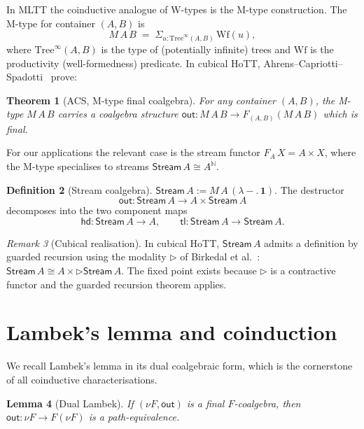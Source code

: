 \documentclass[12pt]{article}
\newtheorem{theorem}{Theorem}[section]
\newtheorem{lemma}[theorem]{Lemma}
\theoremstyle{definition}
\newtheorem{definition}[theorem]{Definition}
\theoremstyle{remark}
\newtheorem{remark}[theorem]{Remark}
\newcommand{\N}{\mathbb{N}}
\newcommand{\Stream}{\mathsf{Stream}}
\newcommand{\hd}{\mathsf{hd}}
\newcommand{\tl}{\mathsf{tl}}
\newcommand{\out}{\mathsf{out}}
\begin{document}
In MLTT the coinductive analogue of W-types is the M-type
construction. The M-type for container $(A,B)$ is
\[
M\,A\,B \;=\; \Sigma_{u: \mathrm{Tree}^\infty(A,B)}\,\mathrm{Wf}(u),
\]
where $\mathrm{Tree}^\infty(A,B)$ is the type of (potentially
infinite) trees and $\mathrm{Wf}$ is the productivity (well-formedness)
predicate. In cubical HoTT, Ahrens--Capriotti--Spadotti~\cite{ACS}
prove:

\begin{theorem}[ACS, M-type final coalgebra]\label{thm:ACS}
For any container $(A,B)$, the M-type $M\,A\,B$ carries a
coalgebra structure $\out: M\,A\,B \to F_{(A,B)}(M\,A\,B)$ which
is final.
\end{theorem}

For our applications the relevant case is the stream functor
$F_A\,X = A \times X$, where the M-type
specialises to streams $\Stream\,A \cong A^\N$.

\begin{definition}[Stream coalgebra]\label{def:streamcoalg}
$\Stream\,A := M\,A\,(\lambda{-}.\,\mathbf{1})$. The destructor
\[
  \out: \Stream\,A \to A \times \Stream\,A
\]
decomposes into the two component maps
\[
  \hd: \Stream\,A \to A, \qquad
  \tl: \Stream\,A \to \Stream\,A.
\]
\end{definition}

\begin{remark}[Cubical realisation]
In cubical HoTT, $\Stream\,A$ admits a definition by guarded
recursion using the modality $\rhd$ of Birkedal et al.~\cite{birkedal}:
$\Stream\,A \cong A \times \rhd \Stream\,A$. The fixed point exists
because $\rhd$ is a contractive functor and the guarded recursion
theorem applies.
\end{remark}

\section{Lambek's lemma and coinduction}\label{sec:lambek}

We recall Lambek's lemma in its dual coalgebraic form, which is
the cornerstone of all coinductive characterisations.

\begin{lemma}[Dual Lambek]\label{lem:lambek}
If $(\nu F, \out)$ is a final $F$-coalgebra, then
$\out: \nu F \to F(\nu F)$ is a path-equivalence.
\end{lemma}
\end{document}
